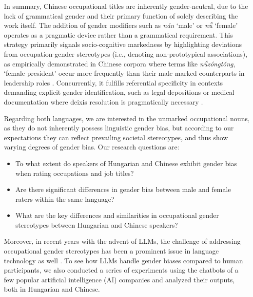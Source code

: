 \documentclass[runningheads]{llncs}
\newcommand{\zh}[1]{\simplifiedchinesefont{#1}\rmfamily}
\begin{document}
In summary, Chinese occupational titles are inherently gender-neutral, due to the lack of grammatical gender and their primary function of solely describing the work itself. The addition of gender modifiers such as \zh{男} \textit{nán} `male' or \zh{女} \textit{nǚ} `female' operates as a pragmatic device rather than a grammatical requirement. This strategy primarily signals socio-cognitive markedness by highlighting deviations from occupation-gender stereotypes (i.e., denoting non-prototypical associations), as empirically demonstrated in Chinese corpora where terms like \zh{女总统} \textit{nǚzóngtǒng}, `female president' occur more frequently than their male-marked counterparts in leadership roles \citep{su_2021_occupational,farris_1988_gender}. Concurrently, it fulfills referential specificity in contexts demanding explicit gender identification, such as legal depositions or medical documentation where deixis resolution is pragmatically necessary \citep{hellinger_2003_gender,stahlberg_2011_representation}.

Regarding both languages, we are interested in the unmarked occupational nouns, as they do not inherently possess linguistic gender bias, but according to our expectations they can reflect prevailing societal stereotypes, and thus show varying degrees of gender bias. Our research questions are: 
\begin{itemize}
  \item To what extent do speakers of Hungarian and Chinese exhibit gender bias when rating occupations and job titles?
  \item Are there significant differences in gender bias between male and female raters within the same language?
  \item What are the key differences and similarities in occupational gender stereotypes between Hungarian and Chinese speakers?
\end{itemize}

\noindent Moreover, in recent years with the advent of LLMs, the challenge of addressing occupational gender stereotypes has been a prominent issue in language technology as well \citep[cf.][]{kirk_2021_bias,ju_2024_female,an_2025_mutual}. To see how LLMs handle gender biases compared to human participants, we also conducted a series of experiments using the chatbots of a few popular artificial intelligence (AI) companies and analyzed their outputs, both in Hungarian and Chinese.

\end{document}
